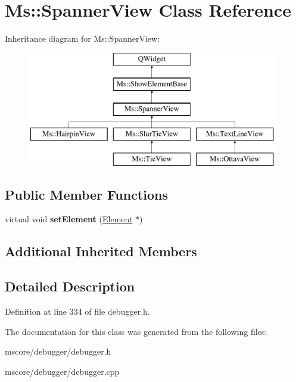 \hypertarget{class_ms_1_1_spanner_view}{}\section{Ms\+:\+:Spanner\+View Class Reference}
\label{class_ms_1_1_spanner_view}
Inheritance diagram for Ms\+:\+:Spanner\+View\+:\begin{figure}[H]
\begin{center}
\leavevmode
\includegraphics[height=5.000000cm]{class_ms_1_1_spanner_view}
\end{center}
\end{figure}
\subsection*{Public Member Functions}
\begin{DoxyCompactItemize}
\item 
\mbox{\label{class_ms_1_1_spanner_view_a46b1324d477a84949552107b4da4c996}} 
virtual void {\bfseries set\+Element} (\hyperlink{class_ms_1_1_element}{Element} $\ast$)
\end{DoxyCompactItemize}
\subsection*{Additional Inherited Members}


\subsection{Detailed Description}


Definition at line 334 of file debugger.\+h.



The documentation for this class was generated from the following files\+:\begin{DoxyCompactItemize}
\item 
mscore/debugger/debugger.\+h\item 
mscore/debugger/debugger.\+cpp\end{DoxyCompactItemize}

